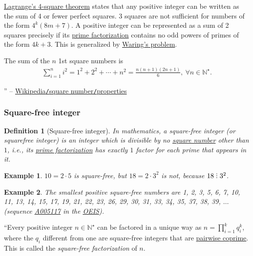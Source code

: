 \documentclass{article}
\newtheorem{definition}{Definition}
\newtheorem{example}{Example}
\DeclareRobustCommand{\divby}{%
	\mathrel{\vbox{\baselineskip.65ex\lineskiplimit0pt\hbox{.}\hbox{.}\hbox{.}}}%
}
\begin{document}
\href{https://en.wikipedia.org/wiki/Lagrange%27s_four-square_theorem}{Lagrange's 4-square theorem} states that any positive integer can be written as the sum of 4 or fewer perfect squares. 3 squares are not sufficient for numbers of the form $4^k(8m + 7)$. A positive integer can be represented as a sum of 2 squares precisely if its \href{https://en.wikipedia.org/wiki/Prime_factorization}{prime factorization} contains no odd powers of primes of the form $4k + 3$. This is generalized by \href{https://en.wikipedia.org/wiki/Waring%27s_problem}{Waring's problem}.


The sum of the $n$ 1st square numbers is
\begin{align*}
	\boxed{\sum_{i=1}^n i^2 = 1^2 + 2^2 + \cdots + n^2 = \frac{n(n + 1)(2n + 1)}{6},\ \forall n\in\mathbb{N}^\star.}
\end{align*}

'' -- \href{https://en.wikipedia.org/wiki/Square_number#Properties}{Wikipedia{\tt /}square number{\tt /}properties}

\subsubsection{Square-free integer}

\begin{definition}[Square-free integer]
	In mathematics, a \emph{square-free integer} (or \emph{squarefree integer}) is an integer which is divisible by no \href{https://en.wikipedia.org/wiki/Square_number}{square number} other than $1$, i.e., its \href{https://en.wikipedia.org/wiki/Prime_factorization}{prime factorization} has exactly $1$ factor for each prime that appears in it.
\end{definition}

\begin{example}
	$10 = 2\cdot5$ is square-free, but $18 = 2\cdot3^2$ is not, because $18\divby3^2$.
\end{example}

\begin{example}
	The smallest positive square-free numbers are \emph{1, 2, 3, 5, 6, 7, 10, 11, 13, 14, 15, 17, 19, 21, 22, 23, 26, 29, 30, 31, 33, 34, 35, 37, 38, 39}, $\ldots$ (sequence \href{https://oeis.org/A005117}{A005117} in the \href{https://en.wikipedia.org/wiki/On-Line_Encyclopedia_of_Integer_Sequences}{OEIS}).
\end{example}
``Every positive integer $n\in\mathbb{N}^\star$ can be factored in a unique way as $n = \prod_{i=1}^k q_i^k$, where the $q_i$ different from one are square-free integers that are \href{https://en.wikipedia.org/wiki/Pairwise_coprime}{pairwise coprime}. This is called the \textit{square-free factorization} of $n$.
\end{document}
